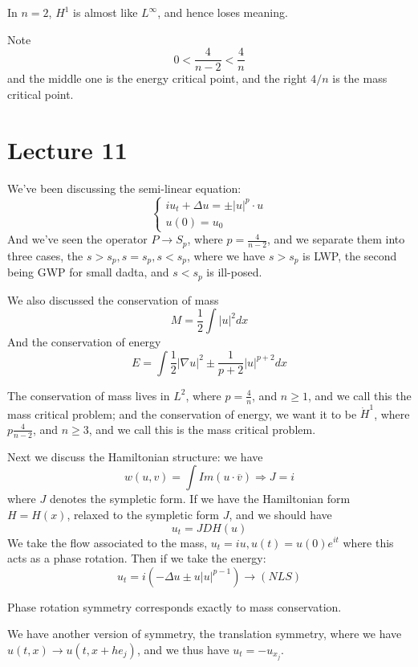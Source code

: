 \begin{note}
    In $n=2$, $H^1$ is almost like $L^\infty$, and hence loses meaning.
\end{note}
Note
\begin{equation*}
    0<\frac{4}{n-2}<\frac{4}{n}
\end{equation*}
and the middle one is the energy critical point, and the right $4/n$ is the mass critical point.


\section{Lecture 11}
We've been discussing the semi-linear equation:
\begin{equation*}
    \begin{cases}
        iu_t+\Delta u=\pm|u|^p\cdot u\\
        u(0)=u_0
    \end{cases}
\end{equation*}
And we've seen the operator $P\to S_p$, where $p=\frac{4}{n-2}$, and we separate them into three cases, the $s>s_p, s=s_p, s<s_p$, where we have $s>s_p$ is LWP, the second being GWP for small dadta, and $s<s_p$ is ill-posed.

We also discussed the conservation of mass
\begin{equation*}
    M=\frac{1}{2}\int|u|^2dx
\end{equation*}
And the conservation of energy
\begin{equation*}
    E=\int\frac{1}{2}|\nabla u|^2\pm \frac{1}{p+2}|u|^{p+2}dx
\end{equation*}

The conservation of mass lives in $L^2$, where $p=\frac{4}{n}$, and $n\geq 1$, and we call this the mass critical problem; and the conservation of energy, we want it to be $\dot{H}^1$, where $p\frac{4}{n-2}$, and $n\geq 3$, and we call this is the mass critical problem.

Next we discuss the Hamiltonian structure: we have
\begin{equation*}
    w(u,v)=\int Im(u\cdot\overline{v})\Rightarrow J=i
\end{equation*}
where $J$ denotes the sympletic form. If we have the Hamiltonian form $H=H(x)$, relaxed to the sympletic form $J$, and we should have
\begin{equation*}
    u_t=JDH(u)
\end{equation*}
We take the flow associated to the mass, $u_t=iu, u(t)=u(0)e^{it}$ where this acts as a phase rotation. Then if we take the energy:
\begin{equation*}
    u_t=i\left(-\Delta u\pm u|u|^{p-1}\right)\rightarrow (NLS)
\end{equation*}
\begin{theorem}
    Phase rotation symmetry corresponds exactly to mass conservation.
\end{theorem}
We have another version of symmetry, the translation symmetry, where we have $u(t,x)\to u(t,x+he_j)$, and we thus have $u_t=-u_{x_j}$. 


